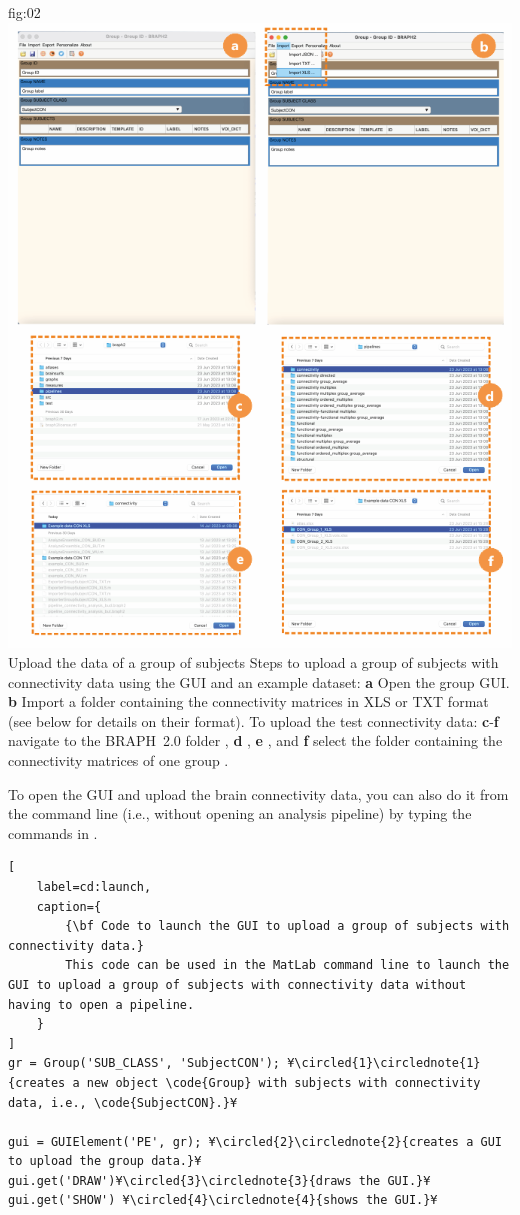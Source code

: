 \documentclass[justified]{tufte-handout}
\begin{document}
	{fig:02}
	{
	\includegraphics{fig02}
	}
	{Upload the data of a group of subjects}
	{
	Steps to upload a group of subjects with connectivity data using the GUI and an example dataset: 
	{\bf a} Open the group GUI.
	{\bf b} Import a folder containing the connectivity matrices in XLS or TXT format (see below for details on their format).
	To upload the test connectivity data:
	{\bf c}-{\bf f} navigate to the BRAPH~2.0 folder , {\bf d} ,  {\bf e} , and {\bf f} select the folder containing the connectivity matrices of one group .
	}

To open the GUI and upload the brain connectivity data, you can also do it from the command line (i.e., without opening an analysis pipeline) by typing the commands in .
%
\begin{lstlisting}[
	label=cd:launch,
	caption={
		{\bf Code to launch the GUI to upload a group of subjects with connectivity data.}
		This code can be used in the MatLab command line to launch the GUI to upload a group of subjects with connectivity data without having to open a pipeline.
	}
]
gr = Group('SUB_CLASS', 'SubjectCON'); ¥\circled{1}\circlednote{1}{creates a new object \code{Group} with subjects with connectivity data, i.e., \code{SubjectCON}.}¥

gui = GUIElement('PE', gr); ¥\circled{2}\circlednote{2}{creates a GUI to upload the group data.}¥
gui.get('DRAW')¥\circled{3}\circlednote{3}{draws the GUI.}¥
gui.get('SHOW') ¥\circled{4}\circlednote{4}{shows the GUI.}¥
\end{lstlisting}
\end{document}
